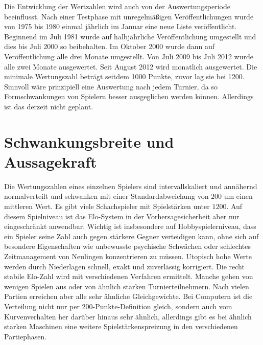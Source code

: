 Die Entwicklung der Wertzahlen wird auch von der Auswertungsperiode beeinflusst. Nach einer Testphase mit unregelmäßigen Veröffentlichungen wurde von 1975 bis 1980 einmal jährlich im Januar eine neue Liste veröffentlicht. Beginnend im Juli 1981 wurde auf halbjährliche Veröffentlichung umgestellt und dies bis Juli 2000 so beibehalten. Im Oktober 2000 wurde dann auf Veröffentlichung alle drei Monate umgestellt. Von Juli 2009 bis Juli 2012 wurde alle zwei Monate ausgewertet. Seit August 2012 wird monatlich ausgewertet. Die minimale Wertungszahl beträgt seitdem 1000 Punkte, zuvor lag sie bei 1200. Sinnvoll wäre prinzipiell eine Auswertung nach jedem Turnier, da so Formschwankungen von Spielern besser ausgeglichen werden können. Allerdings ist das derzeit nicht geplant.


\section{Schwankungsbreite und Aussagekraft}

Die Wertungszahlen eines einzelnen Spielers sind intervallskaliert und annähernd normalverteilt und schwanken mit einer Standardabweichung von $200$ um einen mittleren Wert. Es gibt viele Schachspieler mit Spielstärken unter $1200$. Auf diesem Spielniveau ist das Elo-System in der Vorhersagesicherheit aber nur eingeschränkt anwendbar. Wichtig ist insbesondere auf Hobbyspielerniveau, dass ein Spieler seine Zahl auch gegen stärkere Gegner verteidigen kann, ohne sich auf besondere Eigenschaften wie unbewusste psychische Schwächen oder schlechtes Zeitmanagement von Neulingen konzentrieren zu müssen. Utopisch hohe Werte werden durch Niederlagen schnell, exakt und zuverlässig korrigiert. Die recht stabile Elo-Zahl wird mit verschiedenen Verfahren ermittelt. Manche gehen von wenigen Spielen aus oder von ähnlich starken Turnierteilnehmern. Nach vielen Partien erreichen aber alle sehr ähnliche Gleichgewichte. Bei Computern ist die Verteilung nicht nur per $200$-Punkte-Definition gleich, sondern auch vom Kurvenverhalten her darüber hinaus sehr ähnlich, allerdings gibt es bei ähnlich starken Maschinen eine weitere Spielstärkenspreizung in den verschiedenen Partiephasen.